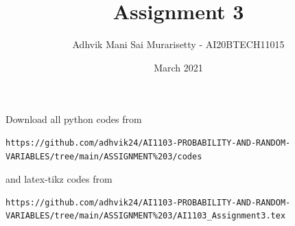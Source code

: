 \documentclass[journal,12pt,twocolumn]{IEEEtran}
\date{March 2021}
\DeclareMathOperator*{\Res}{Res}
\begin{document}
\newcommand{\BEQA}{\begin{eqnarray}}
\newcommand{\EEQA}{\end{eqnarray}}
\newcommand{\define}{\stackrel{\triangle}{=}}

\raggedbottom
\setlength{\parindent}{0pt}
\providecommand{\mbf}{\mathbf}
\providecommand{\pr}[1]{\ensuremath{\Pr\left(#1\right)}}
\providecommand{\qfunc}[1]{\ensuremath{Q\left(#1\right)}}
\providecommand{\fn}[1]{\ensuremath{f\left(#1\right)}}
\providecommand{\e}[1]{\ensuremath{E\left(#1\right)}}
\providecommand{\sbrak}[1]{\ensuremath{{}\left[#1\right]}}
\providecommand{\lsbrak}[1]{\ensuremath{{}\left[#1\right.}}
\providecommand{\rsbrak}[1]{\ensuremath{{}\left.#1\right]}}
\providecommand{\brak}[1]{\ensuremath{\left(#1\right)}}
\providecommand{\lbrak}[1]{\ensuremath{\left(#1\right.}}
\providecommand{\rbrak}[1]{\ensuremath{\left.#1\right)}}
\providecommand{\cbrak}[1]{\ensuremath{\left\{#1\right\}}}
\providecommand{\lcbrak}[1]{\ensuremath{\left\{#1\right.}}
\providecommand{\rcbrak}[1]{\ensuremath{\left.#1\right\}}}
\theoremstyle{remark}
\newtheorem{rem}{Remark}
\newcommand{\sgn}{\mathop{\mathrm{sgn}}}
\providecommand{\abs}[1]{\vert#1\vert}
\providecommand{\res}[1]{\Res\displaylimits_{#1}} 
\providecommand{\norm}[1]{\lVert#1\rVert}
\providecommand{\mtx}[1]{\mathbf{#1}}
\providecommand{\mean}[1]{E[ #1 ]}
\providecommand{\fourier}{\overset{\mathcal{F}}{ \rightleftharpoons}}
\providecommand{\system}{\overset{\mathcal{H}}{ \longleftrightarrow}}
\newcommand{\solution}{\noindent \textbf{Solution: }}
\newcommand{\cosec}{\,\text{cosec}\,}
\providecommand{\dec}[2]{\ensuremath{\overset{#1}{\underset{#2}{\gtrless}}}}
\newcommand{\myvec}[1]{\ensuremath{\begin{pmatrix}#1\end{pmatrix}}}
\newcommand{\mydet}[1]{\ensuremath{\begin{vmatrix}#1\end{vmatrix}}}
\makeatletter
\vspace{3cm}
\title{Assignment 3}
\author{Adhvik Mani Sai Murarisetty - AI20BTECH11015}
\maketitle
\newpage
\bigskip
\renewcommand{\thetable}{\theenumi}
Download all python codes from 
\begin{lstlisting}
https://github.com/adhvik24/AI1103-PROBABILITY-AND-RANDOM-VARIABLES/tree/main/ASSIGNMENT%203/codes
\end{lstlisting}
%
and latex-tikz codes from 
%
\begin{lstlisting}
https://github.com/adhvik24/AI1103-PROBABILITY-AND-RANDOM-VARIABLES/tree/main/ASSIGNMENT%203/AI1103_Assignment3.tex
\end{lstlisting}
\end{document}
